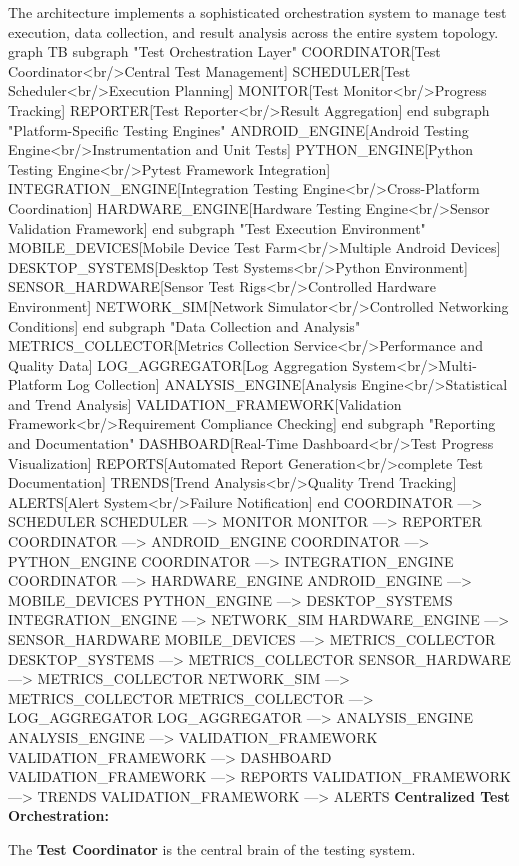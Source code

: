 {{The architecture implements a sophisticated orchestration system to manage test
execution, data collection, and result analysis across the entire system topology.
graph TB subgraph "Test Orchestration Layer" COORDINATOR[Test Coordinator<br/>Central
Test Management] SCHEDULER[Test Scheduler<br/>Execution Planning] MONITOR[Test
Monitor<br/>Progress Tracking] REPORTER[Test Reporter<br/>Result Aggregation] end
subgraph "Platform-Specific Testing Engines" ANDROID\_ENGINE[Android Testing
Engine<br/>Instrumentation and Unit Tests] PYTHON\_ENGINE[Python Testing
Engine<br/>Pytest Framework Integration] INTEGRATION\_ENGINE[Integration Testing
Engine<br/>Cross-Platform Coordination] HARDWARE\_ENGINE[Hardware Testing
Engine<br/>Sensor Validation Framework] end subgraph "Test Execution Environment"
MOBILE\_DEVICES[Mobile Device Test Farm<br/>Multiple Android Devices]
DESKTOP\_SYSTEMS[Desktop Test Systems<br/>Python Environment] SENSOR\_HARDWARE[Sensor
Test Rigs<br/>Controlled Hardware Environment] NETWORK\_SIM[Network
Simulator<br/>Controlled Networking Conditions] end subgraph "Data Collection and
Analysis" METRICS\_COLLECTOR[Metrics Collection Service<br/>Performance and Quality
Data] LOG\_AGGREGATOR[Log Aggregation System<br/>Multi-Platform Log Collection]
ANALYSIS\_ENGINE[Analysis Engine<br/>Statistical and Trend Analysis]
VALIDATION\_FRAMEWORK[Validation Framework<br/>Requirement Compliance Checking] end
subgraph "Reporting and Documentation" DASHBOARD[Real-Time Dashboard<br/>Test
Progress Visualization] REPORTS[Automated Report Generation<br/>complete Test
Documentation] TRENDS[Trend Analysis<br/>Quality Trend Tracking] ALERTS[Alert
System<br/>Failure Notification] end COORDINATOR ---> SCHEDULER SCHEDULER --->
MONITOR MONITOR ---> REPORTER COORDINATOR ---> ANDROID\_ENGINE COORDINATOR --->
PYTHON\_ENGINE COORDINATOR ---> INTEGRATION\_ENGINE COORDINATOR ---> HARDWARE\_ENGINE
ANDROID\_ENGINE ---> MOBILE\_DEVICES PYTHON\_ENGINE ---> DESKTOP\_SYSTEMS
INTEGRATION\_ENGINE ---> NETWORK\_SIM HARDWARE\_ENGINE ---> SENSOR\_HARDWARE
MOBILE\_DEVICES ---> METRICS\_COLLECTOR DESKTOP\_SYSTEMS ---> METRICS\_COLLECTOR
SENSOR\_HARDWARE ---> METRICS\_COLLECTOR NETWORK\_SIM ---> METRICS\_COLLECTOR
METRICS\_COLLECTOR ---> LOG\_AGGREGATOR LOG\_AGGREGATOR ---> ANALYSIS\_ENGINE
ANALYSIS\_ENGINE ---> VALIDATION\_FRAMEWORK VALIDATION\_FRAMEWORK ---> DASHBOARD
VALIDATION\_FRAMEWORK ---> REPORTS VALIDATION\_FRAMEWORK ---> TRENDS
VALIDATION\_FRAMEWORK ---> ALERTS \textbf{Centralized Test Orchestration:}

The \textbf{Test Coordinator}
 is the central brain of the testing system.

}}

